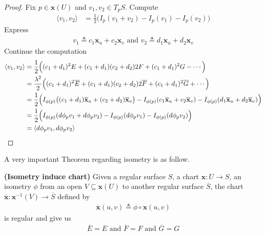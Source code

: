 \documentclass{report}
\begin{document}
\begin{proof}
Fix $p \in \textbf{x}(U)$ and $v_1,v_2 \in T_pS$. Compute
\begin{align*}
\langle v_1,v_2\rangle &= \frac{1}{2}\Big(I_p(v_1+v_2)-I_p(v_1)-I_p(v_2)  \Big)
\end{align*}
Express 
\begin{align*}
v_1\triangleq c_{1}\textbf{x}_u+c_{2} \textbf{x}_v \text{ and }v_2\triangleq d_{1}\textbf{x}_u+d_{2}\textbf{x}_v
\end{align*}
Continue the computation 
\begin{align*}
\langle v_1,v_2\rangle &= \frac{1}{2}\Big( (c_1+d_1)^2 E+ (c_1+d_1)(c_2+d_2)2F + (c_1+d_1)^2 G - \cdots \Big)\\
&=\frac{\lambda ^2}{2}\Big( (c_1+d_1)^2 \overline{E}+ (c_1+d_1)(c_2+d_2)2\overline{F} + (c_1+d_1)^2 \overline{G} + \cdots \Big)\\
&=\frac{1}{2}\Big(I_{\phi(p)}\big((c_1+d_1)\overline{\textbf{x}}_u+ (c_2+d_2)\overline{\textbf{x}}_v \big)- I_{\phi(p)}(c_1\overline{\textbf{x}}_u+c_2 \overline{\textbf{x}}_v)- I_{\phi (p)}(d_1\overline{\textbf{x}}_u+d_2\overline{\textbf{x}}_v) \Big)\\
&=\frac{1}{2}\Big(I_{\phi(p)}(d\phi_p v_1+ d\phi_p v_2)-I_{\phi(p)}(d\phi_p v_1)-I_{\phi(p)}(d\phi_p v_2) \Big)\\
&=\langle d\phi_pv_1, d\phi_p v_2\rangle 
\end{align*}
\end{proof}
\begin{mdframed}
A very important Theorem regarding isometry is as follow. 
\end{mdframed}
\begin{theorem}
\textbf{(Isometry induce chart)} Given a regular surface $S$,  a chart $\textbf{x}:U\rightarrow S$, an isometry $\phi$ from an open $V\subseteq \textbf{x}(U)$ to another regular surface $\overline{S}$, the chart $\overline{\textbf{x}}:\textbf{x}^{-1}(V)\rightarrow \overline{S}$ defined by 
\begin{align*}
\overline{\textbf{x}}(u,v)\triangleq \phi \circ \textbf{x}(u,v)
\end{align*}
is regular and give us 
\begin{align*}
\overline{E}=E\text{ and }\overline{F}=F\text{ and }\overline{G}=G
\end{align*}
\end{theorem}
\end{document}
